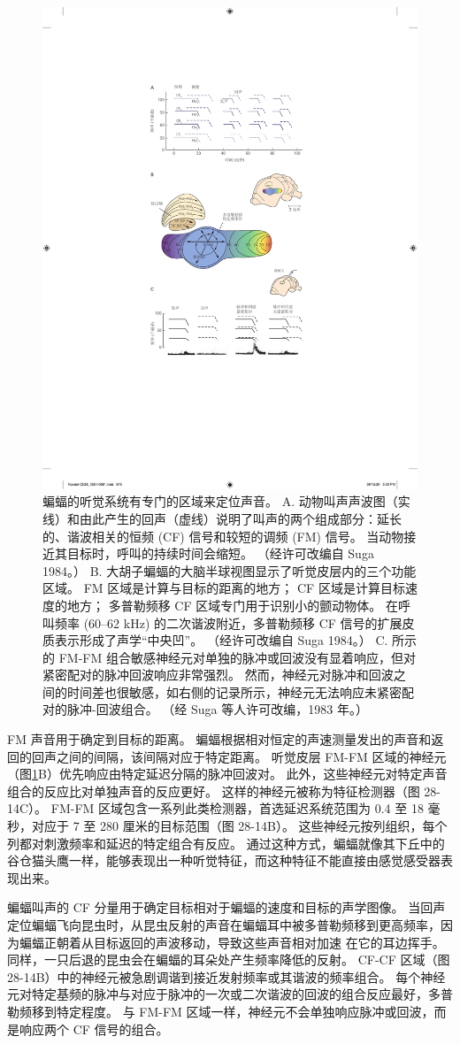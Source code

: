 \begin{figure}[htbp]
	\centering
	\includegraphics[width=0.5\linewidth]{chap28/fig_28_14}
	\caption{蝙蝠的听觉系统有专门的区域来定位声音。 
		A. 动物叫声声波图（实线）和由此产生的回声（虚线）说明了叫声的两个组成部分：延长的、谐波相关的恒频 (CF) 信号和较短的调频 (FM) 信号。 
		当动物接近其目标时，呼叫的持续时间会缩短。 （经许可改编自 Suga 1984。） 
		B. 大胡子蝙蝠的大脑半球视图显示了听觉皮层内的三个功能区域。 FM 区域是计算与目标的距离的地方； CF 区域是计算目标速度的地方； 多普勒频移 CF 区域专门用于识别小的颤动物体。 
		在呼叫频率 (60–62 kHz) 的二次谐波附近，多普勒频移 CF 信号的扩展皮质表示形成了声学“中央凹”。 （经许可改编自 Suga 1984。）
		C. 所示的 FM-FM 组合敏感神经元对单独的脉冲或回波没有显着响应，但对紧密配对的脉冲回波响应非常强烈。 
		然而，神经元对脉冲和回波之间的时间差也很敏感，如右侧的记录所示，神经元无法响应未紧密配对的脉冲-回波组合。 （经 Suga 等人许可改编，1983 年。）}
	\label{fig:28_14}
\end{figure}


FM 声音用于确定到目标的距离。 
蝙蝠根据相对恒定的声速测量发出的声音和返回的回声之间的间隔，该间隔对应于特定距离。 
听觉皮层 FM-FM 区域的神经元（图\ref{fig:28_14}B）优先响应由特定延迟分隔的脉冲回波对。 
此外，这些神经元对特定声音组合的反应比对单独声音的反应更好。 
这样的神经元被称为特征检测器（图 28-14C）。 
FM-FM 区域包含一系列此类检测器，首选延迟系统范围为 0.4 至 18 毫秒，对应于 7 至 280 厘米的目标范围（图 28-14B）。 
这些神经元按列组织，每个列都对刺激频率和延迟的特定组合有反应。 
通过这种方式，蝙蝠就像其下丘中的谷仓猫头鹰一样，能够表现出一种听觉特征，而这种特征不能直接由感觉感受器表现出来。


蝙蝠叫声的 CF 分量用于确定目标相对于蝙蝠的速度和目标的声学图像。 
当回声定位蝙蝠飞向昆虫时，从昆虫反射的声音在蝙蝠耳中被多普勒频移到更高频率，因为蝙蝠正朝着从目标返回的声波移动，导致这些声音相对加速 在它的耳边挥手。 
同样，一只后退的昆虫会在蝙蝠的耳朵处产生频率降低的反射。 
CF-CF 区域（图 28-14B）中的神经元被急剧调谐到接近发射频率或其谐波的频率组合。 
每个神经元对特定基频的脉冲与对应于脉冲的一次或二次谐波的回波的组合反应最好，多普勒频移到特定程度。 
与 FM-FM 区域一样，神经元不会单独响应脉冲或回波，而是响应两个 CF 信号的组合。

